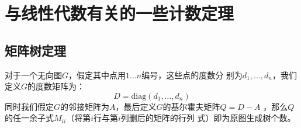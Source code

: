 \section{与线性代数有关的一些计数定理}
\subsection{矩阵树定理}
对于一个无向图$G$，假定其中点用$1\ldots n$编号，这些点的度数分
别为$d_1,\ldots,d_n$，我们定义$G$的度数矩阵为：
\[D=\text{diag}(d_1,\ldots,d_n)\]
同时我们假定$G$的邻接矩阵为$A$，最后定义$G$的基尔霍夫矩阵$Q=D-A$
，那么$Q$的任一余子式$M_{ii}$（将第$i$行与第$i$列删后的矩阵的行列
式）即为原图生成树个数。

